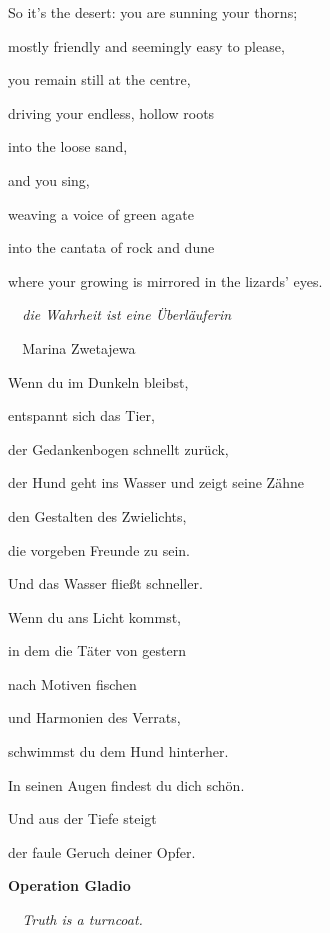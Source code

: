 \bigskip

So it's the desert: you are sunning your thorns;

mostly friendly and seemingly easy to please,

you remain still at the centre, 

driving your endless, hollow roots

into the loose sand,

and you sing,

weaving a voice of green agate 

into the cantata of rock and dune

where your growing is mirrored in the lizards' eyes.


\bigskip



\bigskip

\emph{
\ \ die Wahrheit ist eine Überläuferin}

\emph{\ \ }Marina Zwetajewa


\bigskip


\bigskip

Wenn du im Dunkeln bleibst,

entspannt sich das Tier,

der Gedankenbogen schnellt zurück,

der Hund geht ins Wasser und zeigt seine Zähne 

den Gestalten des Zwielichts, \ 

die vorgeben Freunde zu sein.


\bigskip

Und das Wasser fließt schneller.


\bigskip

Wenn du ans Licht kommst,

in dem die Täter von gestern

nach Motiven fischen

und Harmonien des Verrats,

schwimmst du dem Hund hinterher.

In seinen Augen findest du dich schön.


\bigskip

Und aus der Tiefe steigt 

der faule Geruch deiner Opfer.

\clearpage
\bigskip

{\bfseries
Operation Gladio}


\bigskip

\emph{
\ \ Truth is a turncoat.}

